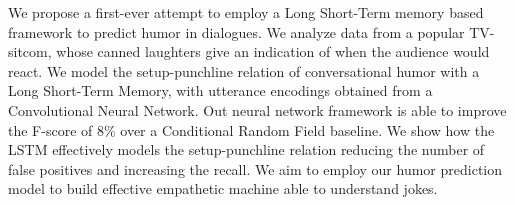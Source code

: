 We propose a first-ever attempt to employ a Long Short-Term memory based framework to predict humor in dialogues. We analyze data from a popular TV-sitcom, whose canned laughters give an indication of when the audience would react. We model the setup-punchline relation of conversational humor with a Long Short-Term Memory, with utterance encodings obtained from a Convolutional Neural Network. Out neural network framework is able to improve the F-score of 8\% over a Conditional Random Field baseline. We show how the LSTM effectively models the setup-punchline relation reducing the number of false positives and increasing the recall. We aim to employ our humor prediction model to build effective empathetic machine able to understand jokes.
